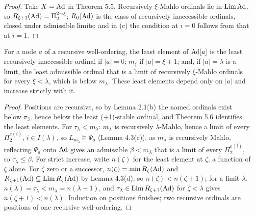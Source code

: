 \documentclass[11pt]{article}
\begin{document}
\begin{proof}
Take $X = \mathrm{Ad}$ in Theorem 5.5. Recursively $\xi$-Mahlo ordinals lie in $\mathrm{Lim}\, \mathrm{Ad}$, so $R_{\xi+1}(\mathrm{Ad}) = \Pi_2^{2+\xi}$;
$R_0(\mathrm{Ad})$ is the class of recursively inaccessible ordinals, closed under admissible limits; and in (c) the condition
at $i = 0$ follows from that at $i = 1$.
\end{proof}

\begin{statement} For a node $a$ of a recursive well-ordering, the least element of
$\mathrm{Ad}[a]$ is the least recursively inaccessible ordinal if $|a| = 0$; $m_\xi$ if $|a| = \xi+1$; and, if $|a| = \lambda$ is a
limit, the least admissible ordinal that is a limit of recursively $\xi$-Mahlo ordinals for every $\xi < \lambda$,
which is below $m_\lambda$. These least elements depend only on $|a|$ and increase
strictly with it.
\end{statement}

\begin{proof}
Positions are recursive, so by Lemma 2.1(b) the named ordinals exist below $\pi_3$, hence below the least (+1)-stable ordinal, and Theorem 5.6 identifies
the least elements. For $\tau_\lambda < m_\lambda$: $m_\lambda$ is recursively $\lambda$-Mahlo, hence a limit of every $\Pi_2^{e(i)}$, $i \in
I(\lambda)$, so $L_{m_\lambda} \models \Psi_a$ (Lemma 4.3(c)); as $m_\lambda$ is recursively Mahlo, reflecting $\Psi_a$ onto
$\mathrm{Ad}$ gives an admissible $\beta < m_\lambda$ that is a limit of every $\Pi_2^{e(i)}$, so $\tau_\lambda \le \beta$. For strict
increase, write $n(\zeta)$ for the least element at $\zeta$, a function of $\zeta$ alone. For $\zeta$ zero or a
successor, $n(\zeta) = \min R_\zeta(\mathrm{Ad})$ and $R_{\zeta+1}(\mathrm{Ad}) \subseteq \mathrm{Lim}\, R_\zeta(\mathrm{Ad})$ by Lemma 4.3(d), so
$n(\zeta) < n(\zeta+1)$; for a limit $\lambda$, $n(\lambda) = \tau_\lambda < m_\lambda = n(\lambda+1)$, and $\tau_\lambda
\in \mathrm{Lim}\, R_{\zeta+1}(\mathrm{Ad})$ for $\zeta < \lambda$ gives $n(\zeta+1) < n(\lambda)$. Induction on positions finishes;
two recursive ordinals are positions of one recursive well-ordering.
\end{proof}
\end{document}

